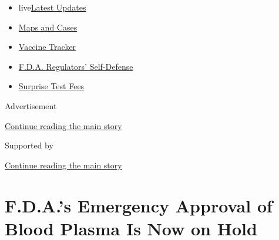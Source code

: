 \begin{itemize}
\tightlist
\item
  live\href{https://www.nytimes3xbfgragh.onion/2020/09/12/world/covid-19-coronavirus.html?name=styln-coronavirus-national\&region=TOP_BANNER\&block=storyline_menu_recirc\&action=click\&pgtype=Article\&impression_id=45479001-f52e-11ea-a92a-d1075f6219dd\&variant=undefined}{Latest
  Updates}
\item
  \href{https://www.nytimes3xbfgragh.onion/interactive/2020/us/coronavirus-us-cases.html?name=styln-coronavirus-national\&region=TOP_BANNER\&block=storyline_menu_recirc\&action=click\&pgtype=Article\&impression_id=45479002-f52e-11ea-a92a-d1075f6219dd\&variant=undefined}{Maps
  and Cases}
\item
  \href{https://www.nytimes3xbfgragh.onion/interactive/2020/science/coronavirus-vaccine-tracker.html?name=styln-coronavirus-national\&region=TOP_BANNER\&block=storyline_menu_recirc\&action=click\&pgtype=Article\&impression_id=4547b710-f52e-11ea-a92a-d1075f6219dd\&variant=undefined}{Vaccine
  Tracker}
\item
  \href{https://www.nytimes3xbfgragh.onion/2020/09/10/us/politics/fda-coronavirus-vaccine.html?name=styln-coronavirus-national\&region=TOP_BANNER\&block=storyline_menu_recirc\&action=click\&pgtype=Article\&impression_id=4547b711-f52e-11ea-a92a-d1075f6219dd\&variant=undefined}{F.D.A.
  Regulators' Self-Defense}
\item
  \href{https://www.nytimes3xbfgragh.onion/2020/09/09/upshot/coronavirus-surprise-test-fees.html?name=styln-coronavirus-national\&region=TOP_BANNER\&block=storyline_menu_recirc\&action=click\&pgtype=Article\&impression_id=4547b712-f52e-11ea-a92a-d1075f6219dd\&variant=undefined}{Surprise
  Test Fees}
\end{itemize}

Advertisement

\protect\hyperlink{after-top}{Continue reading the main story}

Supported by

\protect\hyperlink{after-sponsor}{Continue reading the main story}

\hypertarget{fdas-emergency-approval-of-blood-plasma-is-now-on-hold}{%
\section{F.D.A.'s Emergency Approval of Blood Plasma Is Now on
Hold}\label{fdas-emergency-approval-of-blood-plasma-is-now-on-hold}}

